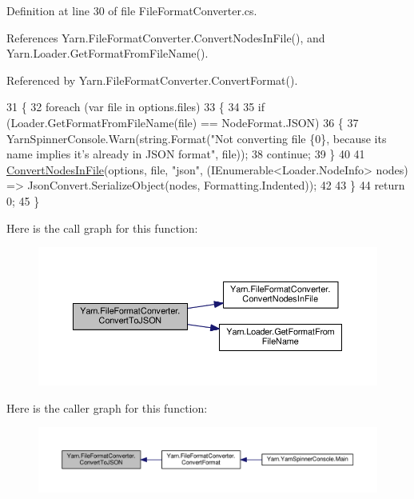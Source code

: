 Definition at line 30 of file File\-Format\-Converter.\-cs.



References Yarn.\-File\-Format\-Converter.\-Convert\-Nodes\-In\-File(), and Yarn.\-Loader.\-Get\-Format\-From\-File\-Name().



Referenced by Yarn.\-File\-Format\-Converter.\-Convert\-Format().


\begin{DoxyCode}
31         \{
32             \textcolor{keywordflow}{foreach} (var file \textcolor{keywordflow}{in} options.files)
33             \{
34 
35                 \textcolor{keywordflow}{if} (Loader.GetFormatFromFileName(file) == NodeFormat.JSON)
36                 \{
37                     YarnSpinnerConsole.Warn(string.Format(\textcolor{stringliteral}{"Not converting file \{0\}, because its name
       implies it's already in JSON format"}, file));
38                     \textcolor{keywordflow}{continue};
39                 \}
40 
41                 \hyperlink{a00099_aa72838be584177b5592c31d73c0febdb}{ConvertNodesInFile}(options, file, \textcolor{stringliteral}{"json"}, (IEnumerable<Loader.NodeInfo> 
      nodes) => JsonConvert.SerializeObject(nodes, Formatting.Indented));
42 
43             \}
44             \textcolor{keywordflow}{return} 0;
45         \}
\end{DoxyCode}


Here is the call graph for this function\-:
\nopagebreak
\begin{figure}[H]
\begin{center}
\leavevmode
\includegraphics[width=350pt]{a00099_a28a086a7b44ecea7430af40436f38df6_cgraph}
\end{center}
\end{figure}




Here is the caller graph for this function\-:
\nopagebreak
\begin{figure}[H]
\begin{center}
\leavevmode
\includegraphics[width=350pt]{a00099_a28a086a7b44ecea7430af40436f38df6_icgraph}
\end{center}
\end{figure}


